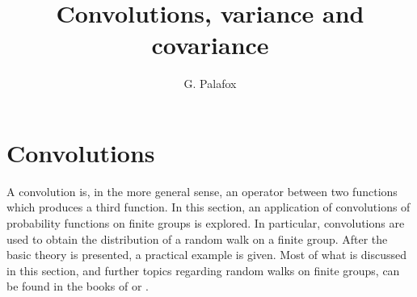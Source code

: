 \documentclass[letterpaper, 10 pt, conference]{article}
\title{Convolutions, variance and covariance
}
\author{G. Palafox}
\begin{document}
\maketitle

\section{Convolutions}
A convolution is, in the more general sense, an operator between two functions which produces a third function. In this section, an application of convolutions of probability functions on finite groups is explored. In particular, convolutions are used to obtain the distribution of a random walk on a finite group. After the basic theory is presented, a practical example is given. Most of what is discussed in this section, and further topics regarding random walks on finite groups, can be found in the books of \citet{Steinberg_2012} or \citet{Diaconis_1988}.
\end{document}
